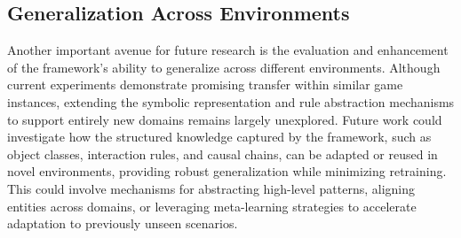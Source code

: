 \documentclass[12pt,a4paper]{report}
\begin{document}
\subsection{Generalization Across Environments}
Another important avenue for future research is the evaluation and enhancement of the framework's ability to generalize across different environments. Although current experiments demonstrate promising transfer within similar game instances, extending the symbolic representation and rule abstraction mechanisms to support entirely new domains remains largely unexplored. Future work could investigate how the structured knowledge captured by the framework, such as object classes, interaction rules, and causal chains, can be adapted or reused in novel environments, providing robust generalization while minimizing retraining. This could involve mechanisms for abstracting high-level patterns, aligning entities across domains, or leveraging meta-learning strategies to accelerate adaptation to previously unseen scenarios.




\end{document}
